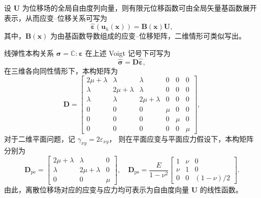 设 $\boldsymbol{U}$ 为位移场的全局自由度列向量，则有限元位移函数可由全局矢量基函数展开表示，从而应变–位移关系可写为
\[
\hat{\boldsymbol{\varepsilon}}(\boldsymbol{u}_h(\boldsymbol{x})) = \boldsymbol{B}(\boldsymbol{x})\boldsymbol{U},
\]
其中，$\boldsymbol{B}(\boldsymbol{x})$ 为由基函数导数组成的应变{--}位移矩阵，二维情形可类似写出。

线弹性本构关系  $\boldsymbol{\sigma} = \mathbb{C}:\boldsymbol{\varepsilon}$ 在上述 Voigt 记号下可写为
\[
\hat{\boldsymbol{\sigma}} = \boldsymbol{D}\hat{\boldsymbol{\varepsilon}},
\]
在三维各向同性情形下，本构矩阵为
\[
\boldsymbol{D} =
\begin{bmatrix}
	2\mu+\lambda &\lambda &\lambda &0 &0 &0\\
	\lambda &2\mu+\lambda &\lambda &0 &0 &0\\
	\lambda &\lambda &2\mu+\lambda &0 &0 &0\\
	0 &0 &0 &\mu &0 &0\\
	0 &0 &0 & 0 &\mu &0\\
	0 &0 &0 &0 &0 &\mu
\end{bmatrix},
\]
对于二维平面问题，记 $\gamma_{xy} = 2\varepsilon_{xy}$，
则在平面应变与平面应力假设下，本构矩阵分别为
\[
\boldsymbol{D}_{\text{pe}} = 
\begin{bmatrix}
	2\mu + \lambda & \lambda & 0 \\
	\lambda & 2\mu + \lambda & 0 \\
	0 & 0 & \mu
\end{bmatrix},\quad
\boldsymbol{D}_{\text{ps}} = \frac{E}{1-\nu^2}
\begin{bmatrix}
	1 &\nu &0\\
	\nu &1 &0\\
	0 &0 &(1-\nu)/2
\end{bmatrix}.
\]
由此，离散位移场对应的应变与应力均可表示为自由度向量 $\boldsymbol{U}$ 的线性函数。

